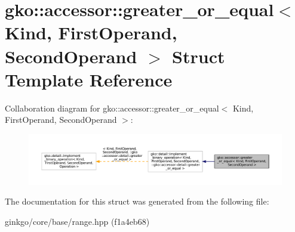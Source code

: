 \hypertarget{structgko_1_1accessor_1_1greater__or__equal}{}\section{gko\+:\+:accessor\+:\+:greater\+\_\+or\+\_\+equal$<$ Kind, First\+Operand, Second\+Operand $>$ Struct Template Reference}
\label{structgko_1_1accessor_1_1greater__or__equal}


Collaboration diagram for gko\+:\+:accessor\+:\+:greater\+\_\+or\+\_\+equal$<$ Kind, First\+Operand, Second\+Operand $>$\+:
\nopagebreak
\begin{figure}[H]
\begin{center}
\leavevmode
\includegraphics[width=350pt]{structgko_1_1accessor_1_1greater__or__equal__coll__graph}
\end{center}
\end{figure}


The documentation for this struct was generated from the following file\+:\begin{DoxyCompactItemize}
\item 
ginkgo/core/base/range.\+hpp (f1a4eb68)\end{DoxyCompactItemize}
